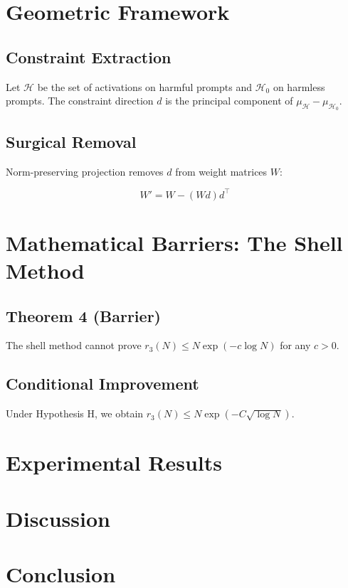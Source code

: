 \documentclass[11pt]{article}
\begin{document}
\section{Geometric Framework}

\subsection{Constraint Extraction}

Let $\mathcal{H}$ be the set of activations on harmful prompts and $\mathcal{H}_0$ on harmless prompts. The constraint direction $d$ is the principal component of $\mu_{\mathcal{H}} - \mu_{\mathcal{H}_0}$.

\subsection{Surgical Removal}

Norm-preserving projection removes $d$ from weight matrices $W$:

\begin{equation}
W' = W - (W d) d^\top
\end{equation}

\section{Mathematical Barriers: The Shell Method}

\subsection{Theorem 4 (Barrier)}
The shell method cannot prove $r_3(N) \le N \exp(-c\log N)$ for any $c>0$.

\subsection{Conditional Improvement}
Under Hypothesis H, we obtain $r_3(N) \le N \exp(-C\sqrt{\log N})$.

\section{Experimental Results}

\section{Discussion}

\section{Conclusion}



\end{document}
